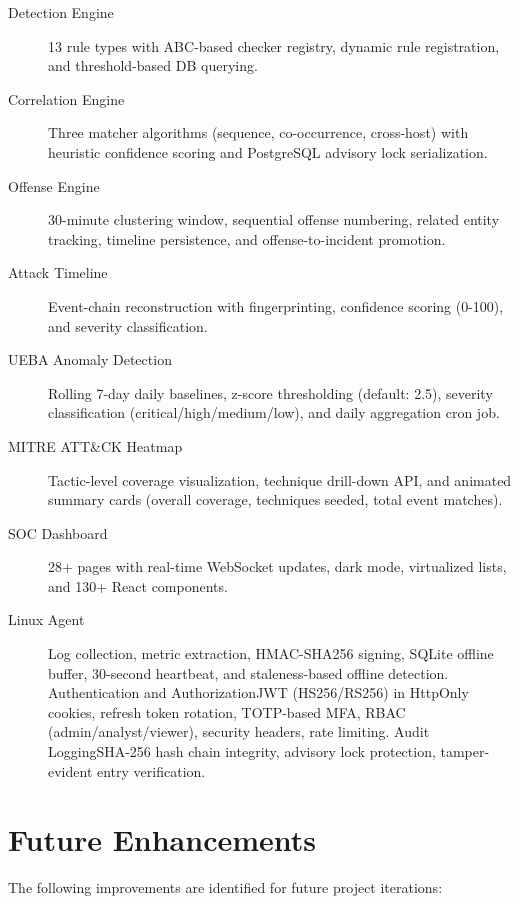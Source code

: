 \begin{description}
    \item[Detection Engine] 13 rule types with ABC-based checker registry, dynamic rule registration, and threshold-based DB querying.
    \item[Correlation Engine] Three matcher algorithms (sequence, co-occurrence, cross-host) with heuristic confidence scoring and PostgreSQL advisory lock serialization.
    \item[Offense Engine] 30-minute clustering window, sequential offense numbering, related entity tracking, timeline persistence, and offense-to-incident promotion.
    \item[Attack Timeline] Event-chain reconstruction with fingerprinting, confidence scoring (0-100), and severity classification.
    \item[UEBA Anomaly Detection] Rolling 7-day daily baselines, z-score thresholding (default: 2.5), severity classification (critical/high/medium/low), and daily aggregation cron job.
    \item[MITRE ATT\&CK Heatmap] Tactic-level coverage visualization, technique drill-down API, and animated summary cards (overall coverage, techniques seeded, total event matches).
    \item[SOC Dashboard] 28+ pages with real-time WebSocket updates, dark mode, virtualized lists, and 130+ React components.
    \item[Linux Agent] Log collection, metric extraction, HMAC-SHA256 signing, SQLite offline buffer, 30-second heartbeat, and staleness-based offline detection.
    \lbrack Authentication and Authorization\rbrack JWT (HS256/RS256) in HttpOnly cookies, refresh token rotation, TOTP-based MFA, RBAC (admin/analyst/viewer), security headers, rate limiting.
    \lbrack Audit Logging\rbrack SHA-256 hash chain integrity, advisory lock protection, tamper-evident entry verification.
\end{description}

\section{Future Enhancements}

The following improvements are identified for future project iterations:


